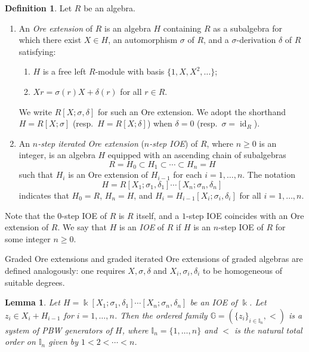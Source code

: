 \documentclass{article}
\theoremstyle{plain}
\newtheorem{lemma}[thm]{Lemma}
\theoremstyle{definition}
\newtheorem{definition}[thm]{Definition}
\numberwithin{equation}{section}
\newcommand{\GG}{\mathbb{G}}
\newcommand{\II}{\mathbb{I}}
\begin{document}
	
	\begin{definition}\label{Ore extension}
		Let $R$ be an algebra.
		\begin{enumerate}
			\item An \emph{Ore extension} of $R$ is an algebra $H$ containing $R$ as a subalgebra for which there exist $X\in H$, an automorphism $\sigma$ of $R$, and a $\sigma$-derivation $\delta$ of $R$ satisfying:
			\begin{enumerate}
				\item $H$ is a free left $R$-module with basis $\{1,X,X^{2},\dots\}$;
				\item $Xr=\sigma(r)X+\delta(r)$ for all $r\in R$.
			\end{enumerate}
			We write $R[X;\sigma,\delta]$ for such an Ore extension. We adopt the shorthand $H=R[X;\sigma]$ (resp.\ $H=R[X;\delta]$) when $\delta=0$ (resp.\ $\sigma=\operatorname{id}_R$).
			
			\item An \emph{$n$-step iterated Ore extension} (\emph{$n$-step IOE}) of $R$, where $n\geq 0$ is an integer, is an algebra $H$ equipped with an ascending chain of subalgebras
			\[
			R=H_{0} \subset H_{1} \subset \cdots \subset H_{n} =H
			\]
			such that $H_{i}$ is an Ore extension of $H_{i-1}$ for each $i=1,\dots, n$. The notation
			\[
			H=R[X_{1};\sigma_{1},\delta_{1}]\cdots [X_{n};\sigma_{n},\delta_{n}]
			\]
			indicates that $H_{0}=R$, $H_{n}=H$, and $H_{i}= H_{i-1}[X_{i};\sigma_{i},\delta_{i}]$ for all $i=1,\dots,n$. 
		\end{enumerate}
		Note that the $0$-step IOE of $R$ is $R$ itself, and a $1$-step IOE coincides with an Ore extension of $R$. We say that $H$ is an \emph{IOE}  of $R$ if $H$ is an $n$-step IOE of $R$ for some integer $n\geq 0$.
	\end{definition}
	
	Graded Ore extensions and graded iterated Ore extensions  of graded algebras are defined analogously: one requires $X,\sigma,\delta$ and $X_{i},\sigma_{i},\delta_{i}$ to be homogeneous of suitable degrees.
	
	\begin{lemma}\label{IOE facts}
		Let $H=\Bbbk[X_{1};\sigma_{1},\delta_{1}]\cdots[X_{n};\sigma_{n},\delta_{n}]$ be an IOE of $\Bbbk$. Let $z_{i} \in X_{i} + H_{i-1}$ for $i=1,\ldots, n$. Then the ordered family $\GG=(\{z_{i}\}_{i\in \II_{n}}, <)$ is a system of PBW generators of $H$, where $\II_{n}=\{1,\ldots, n\}$ and $<$ is the natural total order on $\II_{n}$ given by $1<2<\cdots< n$.
	\end{lemma}
	
\end{document}

